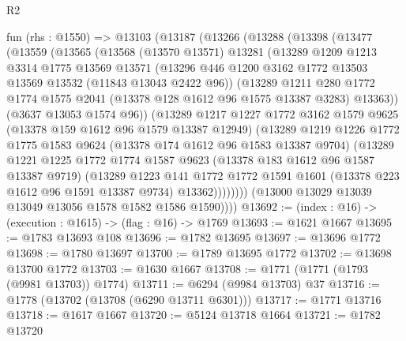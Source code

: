 \begin{lexlean}{R2}
\begin{coremodule}
  fun (rhs : @1550) =>
  @13103
    (@13187
      (@13266
        (@13288
          (@13398
            (@13477
              (@13559
                (@13565
                  (@13568
                    (@13570 @13571)
                    @13281
                    (@13289
                      @1209
                      @1213
                      @3314
                      @1775
                      @13569
                      @13571
                      (@13296 @446 @1200 @3162 @1772 @13503 @13569 @13532 (@11843 @13043 @2422 @96))
                      (@13289
                        @1211
                        @280
                        @1772
                        @1774
                        @1575
                        @2041
                        (@13378 @128 @1612 @96 @1575 @13387 @3283)
                        @13363))
                    (@3637 @13053 @1574 @96))
                  (@13289
                    @1217
                    @1227
                    @1772
                    @3162
                    @1579
                    @9625
                    (@13378 @159 @1612 @96 @1579 @13387 @12949)
                    (@13289
                      @1219
                      @1226
                      @1772
                      @1775
                      @1583
                      @9624
                      (@13378 @174 @1612 @96 @1583 @13387 @9704)
                      (@13289
                        @1221
                        @1225
                        @1772
                        @1774
                        @1587
                        @9623
                        (@13378 @183 @1612 @96 @1587 @13387 @9719)
                        (@13289
                          @1223
                          @141
                          @1772
                          @1772
                          @1591
                          @1601
                          (@13378 @223 @1612 @96 @1591 @13387 @9734)
                          @13362))))))))
          (@13000 @13029 @13039 @13049 @13056 @1578 @1582 @1586 @1590))))
@13692 := (index : @16) -> (execution : @1615) -> (flag : @16) -> @1769
@13693 := @1621 @1667
@13695 := @1783 @13693 @108
@13696 := @1782 @13695
@13697 := @13696 @1772
@13698 := @1780 @13697
@13700 := @1789 @13695 @1772
@13702 := @13698 @13700 @1772
@13703 := @1630 @1667
@13708 := @1771 (@1771 (@1793 (@9981 @13703)) @1774)
@13711 := @6294 (@9984 @13703) @37
@13716 := @1778 (@13702 (@13708 (@6290 @13711 @6301)))
@13717 := @1771 @13716
@13718 := @1617 @1667
@13720 := @5124 @13718 @1664
@13721 := @1782 @13720

\end{coremodule}
\end{lexlean}

